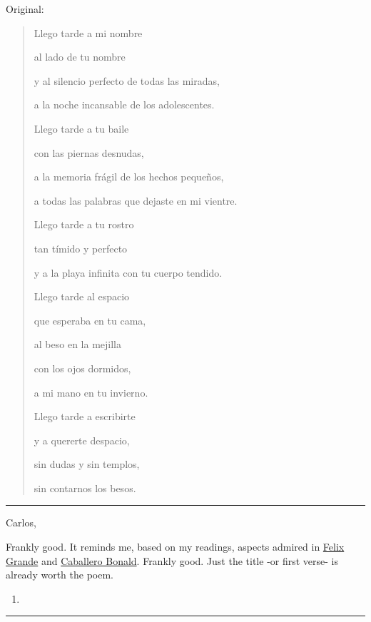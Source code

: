 \documentclass[]{book}
\begin{document}
Original:

\begin{quote}
Llego tarde a mi nombre

al lado de tu nombre

y al silencio perfecto de todas las miradas,

a la noche incansable de los adolescentes.

Llego tarde a tu baile

con las piernas desnudas,

a la memoria frágil de los hechos pequeños,

a todas las palabras que dejaste en mi vientre.

Llego tarde a tu rostro

tan tímido y perfecto

y a la playa infinita con tu cuerpo tendido.

Llego tarde al espacio

que esperaba en tu cama,

al beso en la mejilla

con los ojos dormidos,

a mi mano en tu invierno.

Llego tarde a escribirte

y a quererte despacio,

sin dudas y sin templos,

sin contarnos los besos.

\citep{miralpeix2005cuerpo}
\end{quote}

\begin{center}\rule{0.5\linewidth}{\linethickness}\end{center}

Carlos,

Frankly good. It reminds me, based on my readings, aspects admired in \href{https://es.wikipedia.org/wiki/F\%C3\%A9lix_Grande}{Felix Grande} and \href{https://en.wikipedia.org/wiki/Jos\%C3\%A9_Manuel_Caballero}{Caballero Bonald}. Frankly good. Just the title -or first verse- is already worth the poem.

\begin{enumerate}
\def\labelenumi{\Alph{enumi}.}
\setcounter{enumi}{5}
\item
\end{enumerate}

\begin{center}\rule{0.5\linewidth}{\linethickness}\end{center}
\end{document}
